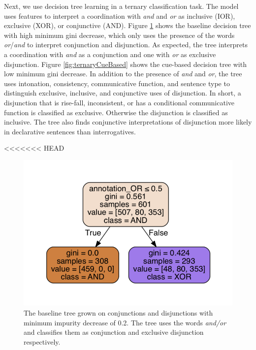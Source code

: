 \documentclass[,man,floatsintext]{apa6}
\begin{document}
Next, we use decision tree learning in a ternary classification task. The model uses features to interpret a coordination with \emph{and} and \emph{or} as inclusive (IOR), exclusive (XOR), or conjunctive (AND). Figure \ref{fig:ternaryBaseline} shows the baseline decision tree with high minimum gini decrease, which only uses the presence of the words \emph{or}/\emph{and} to interpret conjunction and disjunction. As expected, the tree interprets a coordination with \emph{and} as a conjunction and one with \emph{or} as exclusive disjunction. Figure \ref{fig:ternaryCueBased} shows the cue-based decision tree with low minimum gini decrease. In addition to the presence of \emph{and} and \emph{or}, the tree uses intonation, consistency, communicative function, and sentence type to distinguish exclusive, inclusive, and conjunctive uses of disjunction. In short, a disjunction that is rise-fall, inconsistent, or has a conditional communicative function is classified as exclusive. Otherwise the disjunction is classified as inclusive. The tree also finds conjunctive interpretations of disjunction more likely in declarative sentences than interrogatives.

<<<<<<< HEAD
\begin{figure}
\centering
\includegraphics{figs/ternaryBaseline-1.pdf}
\caption{\label{fig:ternaryBaseline}The baseline tree grown on conjunctions and disjunctions with minimum impurity decrease of 0.2. The tree uses the words \textit{and/or} and classifies them as conjunction and exclusive disjunction respectively.}
\end{figure}
\end{document}

